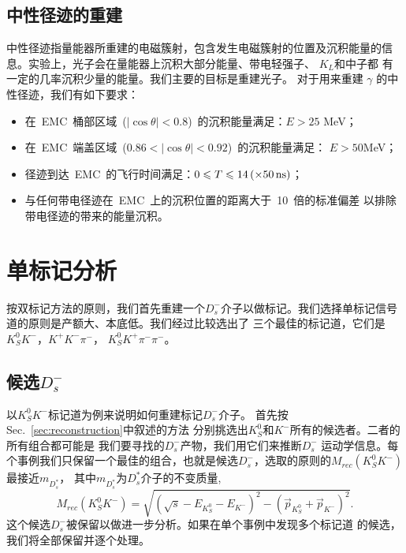 \subsection{中性径迹的重建}
\label{sec:ds-neutral-track}
中性径迹指量能器所重建的电磁簇射，包含发生电磁簇射的位置及沉积能量的信息。实验上，光子会在量能器上沉积大部分能量、带电轻强子、
$K_{L}$和中子都
有一定的几率沉积少量的能量。我们主要的目标是重建光子。
对于用来重建 $\gamma$ 的中性径迹，我们有如下要求：
\begin{itemize}
    \item 在~EMC~桶部区域~($|\cos\theta| < 0.8$)~的沉积能量满足：$E > 25$ MeV；
\item 在~EMC~端盖区域~($0.86 < |\cos\theta| < 0.92$)~的沉积能量满足：
    $E > 50$MeV；
\item 径迹到达~EMC~的飞行时间满足：$0 \leqslant T \leqslant 14\,(\times 50 \,
    {\rm ns})$；
\item 与任何带电径迹在~EMC~上的沉积位置的距离大于~10~倍的标准偏差
    以排除带电径迹的带来的能量沉积。
\end{itemize}

\section{单标记分析}
按双标记方法的原则，我们首先重建一个$D_{s}^{-}$介子以做标记。我们选择单标记信号道的原则是产额大、本底低。我们经过比较选出了
三个最佳的标记道，它们是$K_{S}^{0} K^{-}$，$K^{+} K^{-} \pi^{-}$， 
$K_{S}^{0} K^{+} \pi^{-} \pi^{-}$。
\subsection{候选$D_{s}^{-}$}
以$K_{S}^{0}K^{-}$标记道为例来说明如何重建标记$D_{s}^{-}$介子。
首先按Sec.~\ref{sec:reconstruction}中叙述的方法
分别挑选出$K_{S}^{0}$和$K^{-}$所有的候选者。二者的所有组合都可能是
我们要寻找的$D_{s}^{-}$产物，我们用它们来推断$D_{s}^{-}$
运动学信息。每个事例我们只保留一个最佳的组合，也就是候选$D_{s}^{-}$，选取的原则的$M_{rec}(K_{S}^{0}K^{-})$最接近$m_{D^{*}_{s}}$，
其中$m_{D^{*}_{s}}$为$D^{*}_{s}$介子的不变质量,
\begin{equation}
    M_{rec}(K_{S}^{0}K^{-}) = \sqrt{{\left( \sqrt{s} 
       - E_{K_{S}^{0}} - E_{K^{-}} \right)}^{2}  - 
    {\left(\vec{p}_{K_{S}^{0}} + \vec{p}_{K^{-}} \right)}^{2}}.
\end{equation}
这个候选$D_{s}^{-}$被保留以做进一步分析。如果在单个事例中发现多个标记道
的候选，我们将全部保留并逐个处理。

